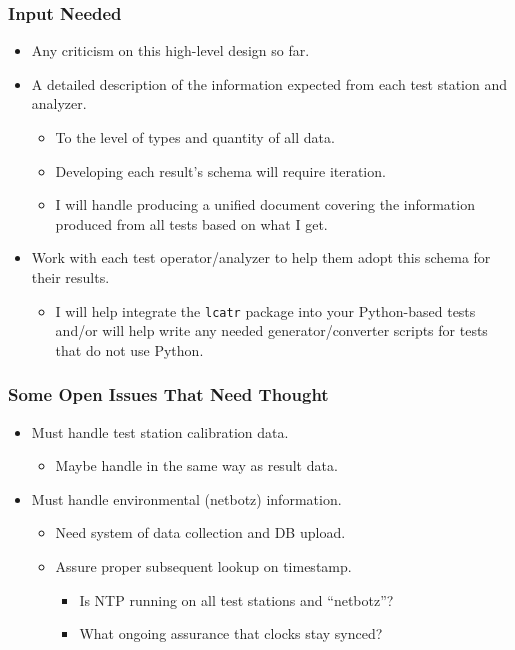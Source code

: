 \documentclass[bigger]{beamer}
\begin{document}
\begin{frame}
  \frametitle{Input Needed}
  \begin{itemize}
  \item Any criticism on this high-level design so far.
  \item A detailed description of the information expected from each
    test station and analyzer.
    \begin{itemize}
    \item To the level of types and quantity of all data.
    \item Developing each result's schema will require iteration.
    \item I will handle producing a unified document covering the
      information produced from all tests based on what I get.
    \end{itemize}
  \item Work with each test operator/analyzer to help them adopt this
    schema for their results.
    \begin{itemize}
    \item I will help integrate the \texttt{lcatr} package into your
      Python-based tests and/or will help write any needed
      generator/converter scripts for tests that do not use Python.
    \end{itemize}
  \end{itemize}
\end{frame}

\begin{frame}
  \frametitle{Some Open Issues That Need Thought}
  \begin{itemize}
  \item Must handle test station calibration data.
    \begin{itemize}
    \item Maybe handle in the same way as result data.
    \end{itemize}
  \item Must handle environmental (netbotz) information.
    \begin{itemize}
    \item Need system of data collection and DB upload.
    \item Assure proper subsequent lookup on timestamp.
      \begin{itemize}
      \item Is NTP running on all test stations and ``netbotz''?
      \item What ongoing assurance that clocks stay synced?
      \end{itemize}
    \end{itemize}
  \end{itemize}
\end{frame}
\end{document}
